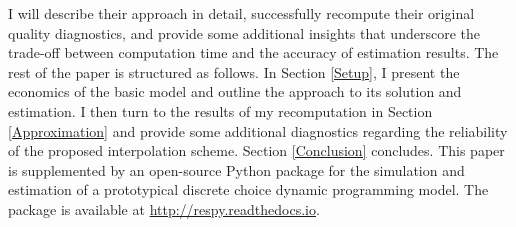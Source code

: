 I will describe their approach in detail, successfully recompute their original quality diagnostics, and provide some additional insights that underscore the trade-off between computation time and the accuracy of estimation results. The rest of the paper is structured as follows. In Section \ref{Setup}, I present the economics of the basic model and outline the approach to its solution and estimation. I then turn to the results of my recomputation in Section \ref{Approximation} and provide some additional diagnostics regarding the reliability of the proposed interpolation scheme. Section \ref{Conclusion} concludes. This paper is supplemented by an open-source Python package for the simulation and estimation of a prototypical discrete choice dynamic programming model. The package is available at \url{http://respy.readthedocs.io}.

